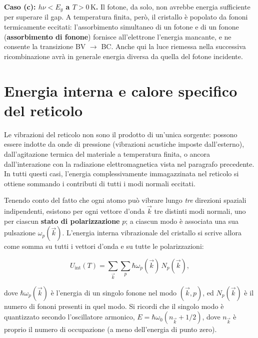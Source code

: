 \begin{example}
\textbf{Caso (c): \( h\nu < E_g \) a \( T > 0\,\text{K} \).} Il fotone, da solo, non avrebbe energia sufficiente per superare il gap. A temperatura finita, però, il cristallo è popolato da fononi termicamente eccitati: l'assorbimento simultaneo di un fotone e di un fonone (\textbf{assorbimento di fonone}) fornisce all'elettrone l'energia mancante, e ne consente la transizione BV \( \to \) BC. Anche qui la luce riemessa nella successiva ricombinazione avrà in generale energia diversa da quella del fotone incidente.
\end{example}

\section{Energia interna e calore specifico del reticolo}


Le vibrazioni del reticolo non sono il prodotto di un'unica sorgente: possono essere indotte da onde di pressione (vibrazioni acustiche imposte dall'esterno), dall'agitazione termica del materiale a temperatura finita, o ancora dall'interazione con la radiazione elettromagnetica vista nel paragrafo precedente. In tutti questi casi, l'energia complessivamente immagazzinata nel reticolo si ottiene sommando i contributi di tutti i modi normali eccitati.

Tenendo conto del fatto che ogni atomo può vibrare lungo \emph{tre} direzioni spaziali indipendenti, esistono per ogni vettore d'onda \( \vec{k} \) tre distinti modi normali, uno per ciascun \textbf{stato di polarizzazione} \( p \); a ciascun modo è associata una sua pulsazione \( \omega_p(\vec{k}) \). L'energia interna vibrazionale del cristallo si scrive allora come somma su tutti i vettori d'onda e su tutte le polarizzazioni:

\begin{importantbox}
    \begin{equation}
        U_{\text{int}}(T) = \sum_{\vec{k}} \sum_{p} \hbar \omega_p(\vec{k}) \, N_p(\vec{k}),
    \end{equation}
\end{importantbox}

dove \( \hbar \omega_p(\vec{k}) \) è l'energia di un singolo fonone nel modo \( (\vec{k}, p) \), ed \( N_p(\vec{k}) \) è il numero di fononi presenti in quel modo. Si ricordi che il singolo modo è quantizzato secondo l'oscillatore armonico, \( E = \hbar \omega_0(n_{\vec{k}} + 1/2) \), dove \( n_{\vec{k}} \) è proprio il numero di occupazione (a meno dell'energia di punto zero).

